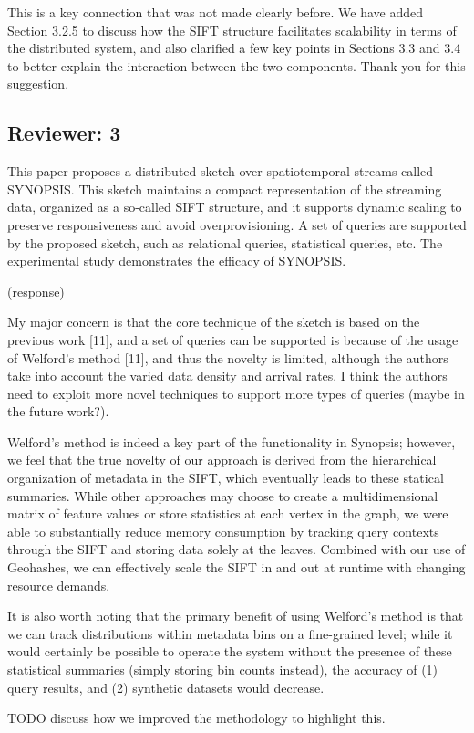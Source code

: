 \documentclass{article}
\begin{document}
\begin{tcolorbox}
    This is a key connection that was not made clearly before. We have added Section 3.2.5 to discuss how the SIFT structure facilitates scalability in terms of the distributed system, and also clarified a few key points in Sections 3.3 and 3.4 to better explain the interaction between the two components. Thank you for this suggestion.
\end{tcolorbox}

\subsection*{Reviewer: 3}\label{reviewer-3}

This paper proposes a distributed sketch over spatiotemporal streams
called SYNOPSIS. This sketch maintains a compact representation of the
streaming data, organized as a so-called SIFT structure, and it supports
dynamic scaling to preserve responsiveness and avoid overprovisioning. A
set of queries are supported by the proposed sketch, such as relational
queries, statistical queries, etc. The experimental study demonstrates
the efficacy of SYNOPSIS.

\begin{tcolorbox}
(response)
\end{tcolorbox}

My major concern is that the core technique of the sketch is based on
the previous work {[}11{]}, and a set of queries can be supported is
because of the usage of Welford's method {[}11{]}, and thus the novelty
is limited, although the authors take into account the varied data
density and arrival rates. I think the authors need to exploit more
novel techniques to support more types of queries (maybe in the future
work?).

\begin{tcolorbox}
Welford's method is indeed a key part of the functionality in Synopsis;
however, we feel that the true novelty of our approach is derived from
the hierarchical organization of metadata in the SIFT, which eventually
leads to these statical summaries. While other approaches may choose to
create a multidimensional matrix of feature values or store statistics
at each vertex in the graph, we were able to substantially reduce memory
consumption by tracking query contexts through the SIFT and storing data
solely at the leaves. Combined with our use of Geohashes, we can
effectively scale the SIFT in and out at runtime with changing resource
demands.

It is also worth noting that the primary benefit of using Welford's
method is that we can track distributions within metadata bins on a
fine-grained level; while it would certainly be possible to operate the
system without the presence of these statistical summaries (simply
storing bin counts instead), the accuracy of (1) query results, and (2)
synthetic datasets would decrease.

TODO discuss how we improved the methodology to highlight this.
\end{tcolorbox}
\end{document}

